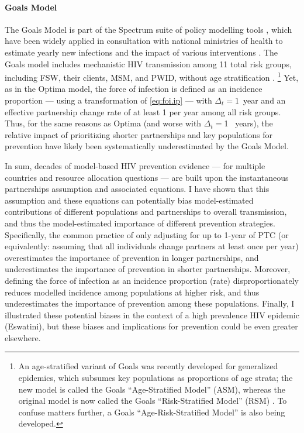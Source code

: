 \paragraph{Goals Model}\cite{Stover2014,Stover2021}
The Goals Model is part of the Spectrum suite of policy modelling tools \cite{Spectrum2022},
which have been widely applied in consultation with national ministries of health
to estimate yearly new infections and the impact of various interventions \cite{Stover2021}.
The Goals model includes mechanistic HIV transmission among 11 total risk groups, including
FSW, their clients, MSM, and PWID, without age stratification \cite{Stover2014}.%
\footnote{An age-stratified variant of Goals was recently developed for generalized epidemics,
  which subsumes key populations as proportions of age strata;
  the new model is called the Goals ``Age-Stratified Model'' (ASM), whereas
  the original model is now called the Goals ``Risk-Stratified Model'' (RSM) \cite{Stover2021}.
  To confuse matters further, a Goals ``Age-Risk-Stratified Model'' is also being developed.}
Yet, as in the Optima model, the force of infection is defined as an incidence proportion
--- using a transformation of \eqref{eq:foi.ip} --- with $\Delta_t = 1$~year
and an effective partnership change rate of at least 1 per year among all risk groups.
Thus, for the same reasons as Optima (and worse with $\Delta_t = {}$1 ~years),
the relative impact of prioritizing shorter partnerships and key populations for prevention
have likely been systematically underestimated by the Goals Model.
\par
In sum, decades of model-based HIV prevention evidence
--- for multiple countries and resource allocation questions ---
are built upon the instantaneous partnerships assumption and associated equations.
I have shown that this assumption and these equations can potentially bias
model-estimated contributions of different populations and partnerships to overall transmission,
and thus the model-estimated importance of different prevention strategies.
Specifically, the common practice of only adjusting for up to 1-year of PTC  %
(or equivalently: assuming that all individuals change partners at least once per year)
overestimates the importance of prevention in longer partnerships, and
underestimates the importance of prevention in shorter partnerships.
Moreover, defining the force of infection as an incidence proportion (\vs rate)
disproportionately reduces modelled incidence among populations at higher risk,
and thus underestimates the importance of prevention among these populations.
Finally, I illustrated these potential biases
in the context of a high prevalence HIV epidemic (Eswatini),
but these biases and implications for prevention could be even greater elsewhere.
